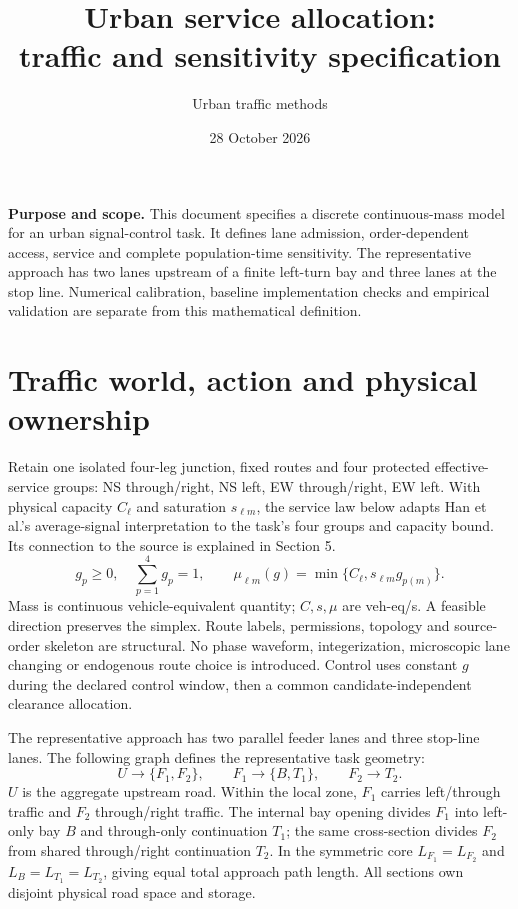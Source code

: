 \documentclass[10pt,a4paper]{article}
\title{Urban service allocation:\\traffic and sensitivity specification}
\author{Urban traffic methods}
\date{28 October 2026}
\begin{document}
\maketitle

\textbf{Purpose and scope.}
This document specifies a discrete continuous-mass model for an urban
signal-control task. It defines lane admission, order-dependent access,
service and complete population-time sensitivity. The representative
approach has two lanes upstream of a finite left-turn bay and three lanes
at the stop line. Numerical calibration, baseline implementation checks
and empirical validation are separate from this mathematical definition.

\section{Traffic world, action and physical ownership}

Retain one isolated four-leg junction, fixed routes and four protected
effective-service groups: NS through/right, NS left, EW through/right,
EW left. With physical capacity $C_\ell$ and saturation $s_{\ell m}$,
the service law below adapts Han et al.'s average-signal interpretation to the task's four groups and capacity bound.
Its connection to the source is explained in Section 5.
\begin{equation}
 g_p\geq0,\quad \sum_{p=1}^4g_p=1,\qquad
 \mu_{\ell m}(g)=\min\{C_\ell,s_{\ell m}g_{p(m)}\}.
 \label{eq:action}
\end{equation}
Mass is continuous vehicle-equivalent quantity; $C,s,\mu$ are veh-eq/s.
A feasible direction preserves the simplex. Route labels, permissions,
topology and source-order skeleton are structural. No phase waveform,
integerization, microscopic lane changing or endogenous route choice is
introduced. Control uses constant $g$ during the declared control window,
then a common candidate-independent clearance allocation.

The representative approach has two parallel feeder lanes and three
stop-line lanes.
The following graph defines the representative task geometry:
\begin{equation}
 U\longrightarrow\{F_1,F_2\},\qquad
 F_1\longrightarrow\{B,T_1\},\qquad F_2\longrightarrow T_2 .
 \label{eq:geometry}
\end{equation}
$U$ is the aggregate upstream road. Within the local zone, $F_1$ carries
left/through traffic and $F_2$ through/right traffic. The internal bay
opening divides $F_1$ into left-only bay $B$ and through-only continuation
$T_1$; the same cross-section divides $F_2$ from shared through/right
continuation $T_2$. In the symmetric core
$L_{F_1}=L_{F_2}$ and $L_B=L_{T_1}=L_{T_2}$, giving equal total approach
path length. All sections own disjoint physical road space and storage.
\end{document}
